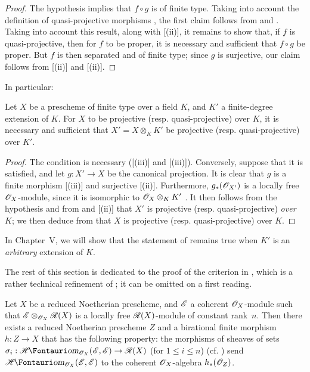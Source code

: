 \begin{proof}
The hypothesis implies that $f\circ g$ is of finite type.
Taking into account the definition of quasi-projective morphisms , the first claim follows from  and .
Taking into account this result, along with [(ii)], it remains to show that, if $f$ is quasi-projective, then for $f$ to be proper, it is necessary and sufficient that $f\circ g$ be proper.
But $f$ is then separated  and of finite type;
since $g$ is surjective, our claim follows from [(ii)] and [(ii)].
\end{proof}

In particular:

\begin{corollary}[6.6.5]
\label{II.6.6.5}
Let $X$ be a prescheme of finite type over a field $K$, and $K'$ a finite-degree extension of $K$.
For $X$ to be projective (resp. quasi-projective) over $K$, it is necessary and sufficient that $X'=X\otimes_K K'$ be projective (resp. quasi-projective) over $K'$.
\end{corollary}

\begin{proof}
The condition is necessary ([(iii)] and [(iii)]).
Conversely, suppose that it is satisfied, and let $g:X'\to X$ be the canonical projection.
It is clear that $g$ is a finite morphism [(iii)] and surjective [(ii)].
Furthermore, $g_*(\mathscr{O}_{X'})$ is a locally free $\mathscr{O}_X$-module, since it is isomorphic to $\mathscr{O}_X\otimes_K K'$ .
It then follows from the hypothesis and from  and [(ii)] that $X'$ is projective (resp. quasi-projective) \emph{over $K$};
we then deduce from  that $X$ is projective (resp. quasi-projective) over $K$.
\end{proof}

In Chapter~V, we will show that the statement of  remains true when $K'$ is an \emph{arbitrary} extension of $K$.

The rest of this section is dedicated to the proof of the criterion in , which is a rather technical refinement of ;
it can be omitted on a first reading.

\begin{lemma}[6.6.6]
\label{II.6.6.6}
Let $X$ be a reduced Noetherian prescheme, and $\mathscr{E}$ a coherent $\mathscr{O}_X$-module such that $\mathscr{E}\otimes_{\mathscr{O}_X}\mathscr{R}(X)$ is a locally free $\mathscr{R}(X)$-module of constant rank~$n$.
Then there exists a reduced Noetherian prescheme $Z$ and a birational finite morphism $h:Z\to X$ that has the following property: the morphisms of sheaves of sets $\sigma_i:\shHom_{\sh{O}_X}(\sh{E},\sh{E})\to\sh{R}(X)$ (for $1\leq i\leq n$) (cf. ) send $\shHom_{\sh{O}_X}(\sh{E},\sh{E})$ to the coherent $\mathscr{O}_X$-algebra $h_*(\mathscr{O}_Z)$.
\end{lemma}

